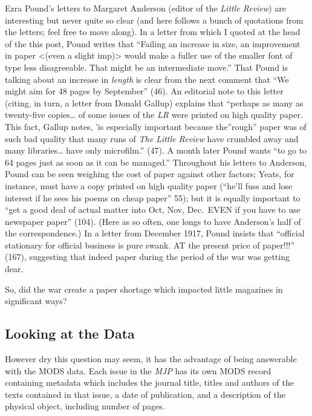 \documentclass[
  12pt,
]{article}
\begin{document}
Ezra Pound's letters to Margaret Anderson (editor of the \emph{Little
Review}) are interesting but never quite so clear (and here follows a
bunch of quotations from the letters; feel free to move along). In a
letter from which I quoted at the head of the this post, Pound writes
that ``Failing an increase in size, an improvement in paper
\textless(even a slight imp)\textgreater{} would make a fuller use of
the smaller font of type less disagreeable. That might be an
intermediate move.'' That Pound is talking about an increase in
\emph{length} is clear from the next comment that ``We might aim for 48
pages by September'' (46). An editorial note to this letter (citing, in
turn, a letter from Donald Gallup) explains that ``perhaps as many as
twenty-five copies\ldots{} of some issues of the \emph{LR} were printed
on high quality paper. This fact, Gallup notes, 'is especially important
because the''rough'' paper was of such bad quality that many runs of
\emph{The Little Review} have crumbled away and many libraries\ldots{}
have only microfilm.'' (47). A month later Pound wants ``to go to 64
pages just as soon as it can be managed.'' Throughout his letters to
Anderson, Pound can be seen weighing the cost of paper against other
factors; Yeats, for instance, must have a copy printed on high quality
paper (``he'll fuss and lose interest if he sees his poems on cheap
paper'' 55); but it is equally important to ``get a good deal of actual
matter into Oct, Nov, Dec.~EVEN if you have to use newspaper paper''
(104). (Here as so often, one longs to have Anderson's half of the
correspondence.) In a letter from December 1917, Pound insists that
``official stationary for official business is pure swank. AT the
present price of paper!!!'' (167), suggesting that indeed paper during
the period of the war was getting dear.

So, did the war create a paper shortage which impacted little magazines
in significant ways?

\hypertarget{looking-at-the-data}{%
\subsection{Looking at the Data}\label{looking-at-the-data}}

However dry this question may seem, it has the advantage of being
answerable with the MODS data. Each issue in the \emph{MJP} has its own
MODS record containing metadata which includes the journal title, titles
and authors of the texts contained in that issue, a date of publication,
and a description of the physical object, including number of pages.
\end{document}
